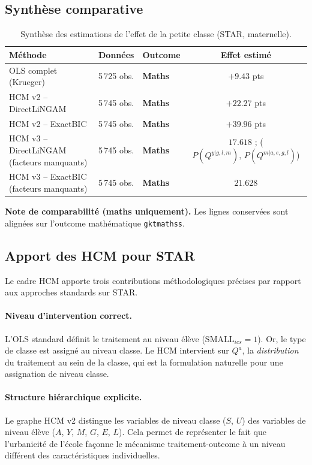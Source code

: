 \documentclass[11pt,a4paper]{article}
\begin{document}
\subsection{Synthèse comparative}

\begin{table}[H]
\centering
\caption{Synthèse des estimations de l'effet de la petite classe (STAR, maternelle).}
\label{tab:star_synthesis}
\begin{tabular}{p{4.5cm}lp{4cm}c}
\toprule
Méthode & Données & Outcome & Effet estimé \\
\midrule
OLS complet (Krueger) & 5\,725 obs. & \textbf{Maths} & $+9.43$ pts \\
HCM v2 -- DirectLiNGAM & 5\,745 obs. & \textbf{Maths} & $+22.27$ pts \\
HCM v2 -- ExactBIC & 5\,745 obs. & \textbf{Maths} & $+39.96$ pts \\
HCM v3 -- DirectLiNGAM (facteurs manquants) & 5\,745 obs. & \textbf{Maths} & $17.618$ ; ($P(Q^{y|g,l,m}),\,P(Q^{m|a,e,g,l})$) \\
HCM v3 -- ExactBIC (facteurs manquants) & 5\,745 obs. & \textbf{Maths} & $21.628$ \\
\bottomrule
\end{tabular}
\end{table}

\textbf{Note de comparabilité (maths uniquement).} Les lignes conservées sont alignées sur l'outcome mathématique \texttt{gktmathss}.

\subsection{Apport des HCM pour STAR}

Le cadre HCM apporte trois contributions méthodologiques précises par rapport aux approches standards sur STAR.

\paragraph{Niveau d'intervention correct.} L'OLS standard définit le traitement au niveau élève ($\mathrm{SMALL}_{ics} = 1$). Or, le type de classe est assigné au niveau classe. Le HCM intervient sur $Q^a$, la \emph{distribution} du traitement au sein de la classe, qui est la formulation naturelle pour une assignation de niveau classe.

\paragraph{Structure hiérarchique explicite.} Le graphe HCM v2 distingue les variables de niveau classe ($S$, $U$) des variables de niveau élève ($A$, $Y$, $M$, $G$, $E$, $L$). Cela permet de représenter le fait que l'urbanicité de l'école façonne le mécanisme traitement-outcome à un niveau différent des caractéristiques individuelles.
\end{document}
